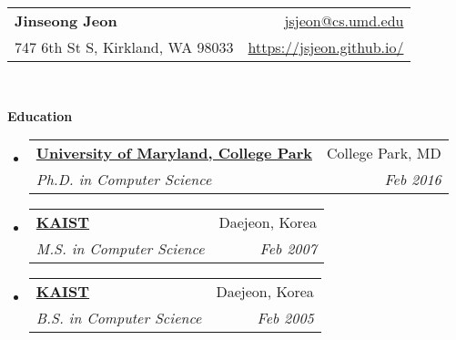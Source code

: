 \documentclass[letterpaper,11pt]{article}
\makeatletter
\newcommand{\resheading}[1]{{\large \colorbox{mygrey}{\begin{minipage}{\textwidth}{\textbf{#1 \vphantom{p\^{E}}}}\end{minipage}}}}
\newcommand{\ressubheading}[4]{
\begin{tabular*}{6.5in}{l@{\extracolsep{\fill}}r}
    \textbf{#1} & #2 \\
    \textit{#3} & \textit{#4} \\
\end{tabular*}\vspace{-6pt}}
\makeatother
\begin{document}
\newcommand{\mywebheader}{
\begin{tabular*}{7in}{l@{\extracolsep{\fill}}r}
  \textbf{{\LARGE Jinseong Jeon}}
& \href{mailto:jsjeon@cs.umd.edu}{jsjeon@cs.umd.edu}
\\
  {\small 747 6th St S, Kirkland, WA 98033}
& \href{https://jsjeon.github.io/}{\url{https://jsjeon.github.io/}}
\\
\end{tabular*}
\\
\vspace{0.1in}}

\mywebheader

\resheading{Education}
  \begin{itemize}
    \item
      \ressubheading{\href{https://www.cs.umd.edu}{University of Maryland, College Park}}{College Park, MD}{{Ph.D. in Computer Science}}{Feb 2016}
    \item
      \ressubheading{\href{https://cs.kaist.ac.kr}{KAIST}}{Daejeon, Korea}{{M.S. in Computer Science}}{Feb 2007}
\begin{comment}
Outstanding Master's Thesis Award from Dept. of Computer Science, KAIST
\end{comment}
    \item
      \ressubheading{\href{https://cs.kaist.ac.kr}{KAIST}}{Daejeon, Korea}{{B.S. in Computer Science}}{Feb 2005}
\begin{comment}
Graduated with High Honor (\emph{Magna Cum Laude})
\end{comment}
  \end{itemize} %
\end{document}
